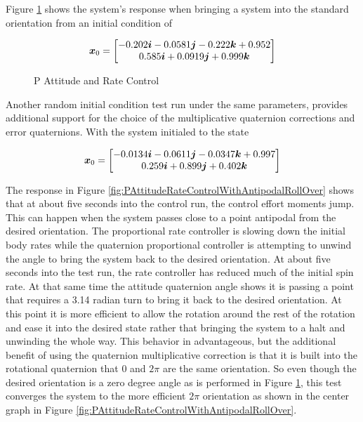 Figure \ref{fig:PAttitudeRateControl} shows the system's response when bringing a system into the standard orientation from an initial condition of

\begin{equation}
  \boldsymbol{x}_0 = \begin{bmatrix} -0.202 \boldsymbol{i} -0.0581 \boldsymbol{j} -0.222 \boldsymbol{k} +0.952 \\ 0.585 \boldsymbol{i} +0.0919 \boldsymbol{j} +0.999 \boldsymbol{k} \end{bmatrix}
\end{equation}

\begin{figure}[H]
  \centerline{}
  \caption{P Attitude and Rate Control}
  \label{fig:PAttitudeRateControl}
\end{figure}

Another random initial condition test run under the same parameters, provides additional support for the choice of the multiplicative quaternion corrections and error quaternions.  With the system initialed to the state

\begin{equation}
  \boldsymbol{x}_0 = \begin{bmatrix} -0.0134 \boldsymbol{i} -0.0611 \boldsymbol{j} -0.0347 \boldsymbol{k} +0.997 \\ 0.259 \boldsymbol{i} +0.899 \boldsymbol{j} +0.402 \boldsymbol{k} \end{bmatrix}
\end{equation}

The response in Figure \ref{fig:PAttitudeRateControlWithAntipodalRollOver} shows that at about five seconds into the control run, the control effort moments jump.  This can happen when the system passes close to a point antipodal from the desired orientation.  The proportional rate controller is slowing down the initial body rates while the quaternion proportional controller is attempting to unwind the angle to bring the system back to the desired orientation.  At about five seconds into the test run, the rate controller has reduced much of the initial spin rate.  At that same time the attitude quaternion angle shows it is passing a point that requires a 3.14 radian turn to bring it back to the desired orientation.  At this point it is more efficient to allow the rotation around the rest of the rotation and ease it into the desired state rather that bringing the system to a halt and unwinding the whole way.  This behavior in advantageous, but the additional benefit of using the quaternion multiplicative correction is that it is built into the rotational quaternion that 0 and $2\pi$ are the same orientation.  So even though the desired orientation is a zero degree angle as is performed in Figure \ref{fig:PAttitudeRateControl}, this test converges the system to the more efficient $2\pi$ orientation as shown in the center graph in Figure \ref{fig:PAttitudeRateControlWithAntipodalRollOver}.

